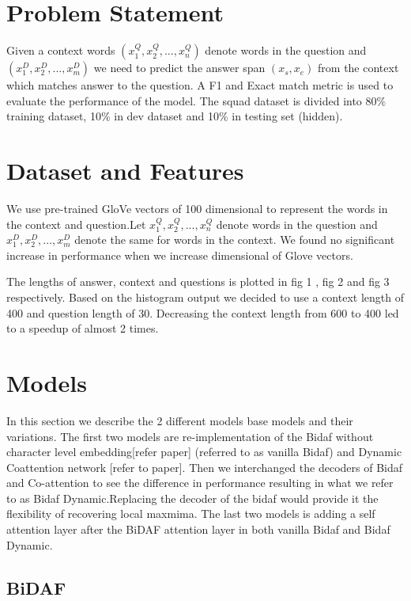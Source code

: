 \documentclass{article} %
\begin{document}
\section{Problem Statement}

Given a context words $( x^{Q}_{1} , x^{Q}_{2} , . . . , x^{Q}_{n} )$ denote words in the question and  $(x^{D}_{1} , x^{D}_{2} , . . . , x^{D}_{m} )$ we need to predict the answer span $(x_{s}, x_{e})$ from the context which matches answer to the question. A F1 and Exact match metric is used to evaluate the performance of the model. The squad dataset is divided into 80\%  training dataset, 10\% in dev dataset and 10\% in testing set (hidden).

\section{Dataset and Features}


We use pre-trained GloVe vectors  of 100 dimensional to represent the words in the context and question.Let \( x^{Q}_{1} , x^{Q}_{2} , . . . , x^{Q}_{n} \)  denote words in the question and \(x^{D}_{1} , x^{D}_{2} , . . . , x^{D}_{m} \) denote the same for words in the context. We found no significant increase in performance when we increase dimensional of Glove vectors. 

The lengths of answer, context and questions is plotted in fig 1 , fig 2 and fig 3 respectively. Based on the histogram output we decided to use a context length of 400 and question length of 30. Decreasing the context length from 600 to 400 led to a speedup of almost 2 times.


\section{Models}
In this section we describe the 2 different models base models and their variations. The first two models are re-implementation of the Bidaf without character level embedding[refer paper] (referred to as vanilla Bidaf) and Dynamic Coattention network [refer to paper]. Then we interchanged the decoders of Bidaf and Co-attention to see the difference in performance resulting in what we refer to as Bidaf Dynamic.Replacing the decoder of the bidaf would provide it the flexibility of recovering local maxmima. The last two models is adding a self attention layer after the BiDAF attention layer in both vanilla Bidaf and Bidaf Dynamic. 

\subsection{BiDAF}
\end{document}
